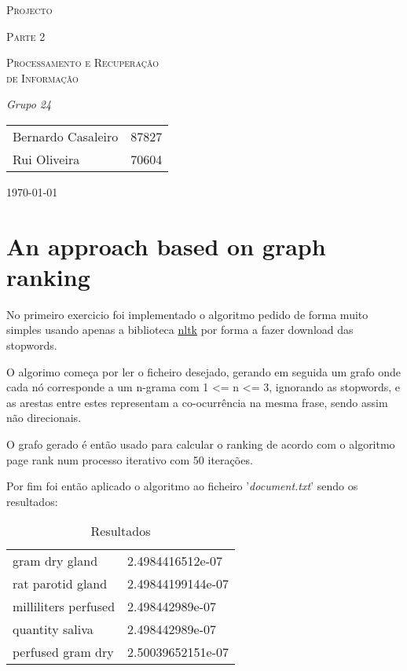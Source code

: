 \documentclass[a4paper,titlepage,11pt]{article}
\begin{document}
\begin{titlepage}
  \begin{center}
    {\scshape \huge Projecto \par}
    \vspace{1cm}

    {\scshape \LARGE Parte 2 \par}
    \vspace{1.5cm}

    {\scshape \Large Processamento e Recuperação \\ de Informação \par}
    \vfill

    {\itshape \Large Grupo 24 \par}
    \vfill

    \begin{tabular}{l l}
      Bernardo Casaleiro & 87827\\
      Rui Oliveira & 70604\\
    \end{tabular}
    \vfill

    {\large \today\par}
  \end{center}
\end{titlepage}

\section{An approach based on graph ranking}
No primeiro exercicio foi implementado o algoritmo pedido de forma muito simples usando apenas a
biblioteca \href{http://nltk.org/}{nltk} por forma a fazer download das stopwords.

O algorimo começa por ler o ficheiro desejado, gerando em seguida um grafo onde cada nó corresponde a
um n-grama com 1 \textless= n \textless= 3, ignorando as stopwords,  e as arestas entre estes representam
a co-ocurrência na mesma frase, sendo assim não direcionais.

O grafo gerado é então usado para calcular o ranking de acordo com o algoritmo page rank num processo
iterativo com 50 iterações.

Por fim foi então aplicado o algoritmo ao ficheiro '\textit{document.txt}' sendo os resultados:

\begin{table}[ht]
  \centering
  \begin{tabular}{ll}
    gram dry gland & 2.4984416512e-07 \\
    rat parotid gland & 2.49844199144e-07 \\
    milliliters perfused & 2.498442989e-07 \\
    quantity saliva & 2.498442989e-07 \\
    perfused gram dry & 2.50039652151e-07
  \end{tabular}
  \caption{Resultados}
\end{table}
\end{document}
